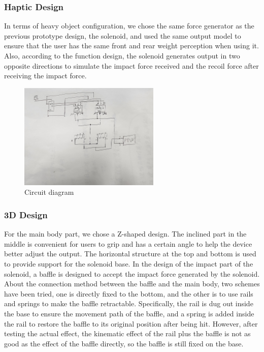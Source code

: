 \subsubsection{Haptic Design}
In terms of heavy object configuration, we chose the same force generator as the previous prototype design, the solenoid, and used the same output model to ensure that the user has the same front and rear weight perception when using it. Also, according to the function design, the solenoid generates output in two opposite directions to simulate the impact force received and the recoil force after receiving the impact force.

\begin{figure}[h]
\centering
\includegraphics[width=0.6\textwidth]{A_thesis/figures/024.jpg}
\caption{Circuit diagram}
\end{figure}

\subsubsection{3D Design}
For the main body part, we chose a Z-shaped design. The inclined part in the middle is convenient for users to grip and has a certain angle to help the  device better adjust the output. The horizontal structure at the top and bottom is used to provide support for the solenoid base.
In the design of the impact part of the solenoid, a baffle is designed to accept the impact force generated by the solenoid. About the connection method between the baffle and the main body, two schemes have been tried, one is directly fixed to the bottom, and the other is to use rails and springs to make the baffle retractable. Specifically, the rail is dug out inside the base to ensure the movement path of the baffle, and a spring is added inside the rail to restore the baffle to its original position after being hit. However, after testing the actual effect, the kinematic effect of the rail plus the baffle is not as good as the effect of the baffle directly, so the baffle is still fixed on the base.

